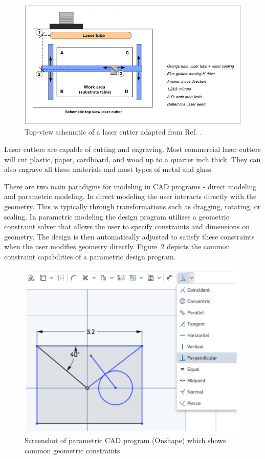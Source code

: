 \begin{figure}[H]
  \includegraphics[width=\linewidth]{lasersystem.jpg}
  \caption{Top-view schematic of a laser cutter adapted from Ref. \cite{laos}.}
  \label{fig:lasersystem}
\end{figure}

Laser cutters are capable of cutting and engraving. Most commercial laser cutters will cut plastic, paper, cardboard, and wood up to a quarter inch thick. They can also engrave all these materials and most types of metal and glass.

There are two main paradigms for modeling in CAD programs - direct modeling and parametric modeling. In direct modeling the user interacts directly with the geometry. This is typically through transformations such as dragging, rotating, or scaling. In parametric modeling the design program utilizes a geometric constraint solver that allows the user to specify constraints and dimensions on geometry. The design is then automatically adjusted to satisfy these constraints when the user modifies geometry directly. Figure~\ref{fig:parametricProgram} depicts the common constraint capabilities of a parametric design program.

\begin{figure}[H]
  \includegraphics[width=\linewidth]{parametricProgram.jpg}
  \caption{Screenshot of parametric CAD program (Onshape) which shows common geometric constraints.}
  \label{fig:parametricProgram}
\end{figure}

